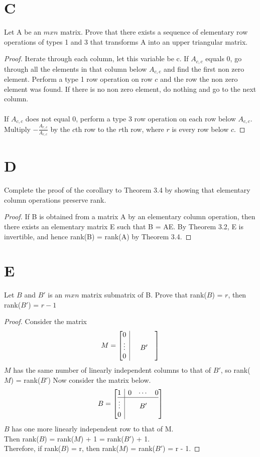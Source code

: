 \documentclass[11pt]{scrartcl}
\begin{document}
\section{C}
Let A be an $mxn$ matrix. Prove that there exists a sequence of elementary row operations of types 1 and 3 that
transforms A into an upper triangular matrix.
\begin{proof}
	Iterate through each column, let this variable be c. If $A_{c,c}$ equals 0, go through all the elements in that column below
	$A_{c,c}$ and find the first non zero element. Perform a type 1 row operation on row $c$ and the row the non zero element
	was found. If there is no non zero element, do nothing and go to the next column. \\
	\-\\
	If $A_{c,c}$ does not equal 0, perform a type 3 row operation on each row below $A_{c,c}$. Multiply 
	$- \frac{A_{r,c}}{A_{c,c}}$ by the $c$th row to the $r$th row, where $r$ is every row below $c$.  
\end{proof}

\section{D}
Complete the proof of the corollary to Theorem 3.4 by showing that elementary column operations preserve rank.
\begin{proof}
	If B is obtained from a matrix A by an elementary column operation,
	then there exists an elementary matrix E such that B = AE. By Theorem 3.2, 
	E is invertible, and hence rank(B) = rank(A) by Theorem 3.4. 
\end{proof}
	

\section{E}
Let $B$ and $B'$ is an $mxn$ matrix submatrix of B. Prove that rank($B$) = $r$, then rank($B'$) = $r - 1$
\begin{proof}
Consider the matrix 
\[
M=
\left[\begin{array}{@{}c|ccc@{}}
0 & & & \\
\vdots & & B' & \\
0 & & &
\end{array}\right]	
\]
$M$ has the same number of linearly independent columns to that of $B'$, so rank($M$) = rank($B'$)
Now consider the matrix below.
\[
B=
\left[\begin{array}{@{}c|ccc@{}}
1 & 0 &\cdots &0 \\ \hline
\vdots & & B' & \\
0 & & &
\end{array}\right]	
\]
$B$ has one more linearly independent row to that of M.\\ Then rank($B$) = rank($M$) + 1 = rank($B'$) + 1.\\
Therefore, if rank($B$) = r, then rank($M$) = rank($B'$) = r - 1.
\end{proof}
	
\end{document}
